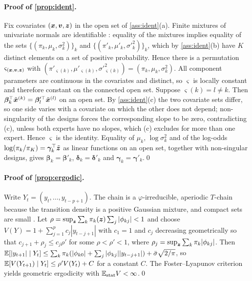 \paragraph{Proof of \cref{prop:ident}.}
Fix covariates $(\bm{x},\bm{v},\bm{z})$ in the open set of \cref{ass:ident}(a). Finite mixtures of
univariate normals are identifiable \citep{teicher1963identifiability}: equality of the mixtures
implies equality of the sets $\{(\pi_k,\mu_k,\sigma_k^2)\}_{k}$ and $\{(\pi'_k,\mu'_k,\sigma'^2_k)\}_k$,
which by \cref{ass:ident}(b) have $K$ distinct elements on a set of positive probability. Hence there
is a permutation $\varsigma_{(\bm{x},\bm{v},\bm{z})}$ with
$(\pi'_{\varsigma(k)},\mu'_{\varsigma(k)},\sigma'^2_{\varsigma(k)})=(\pi_k,\mu_k,\sigma_k^2)$. All
component parameters are continuous in the covariates and distinct, so $\varsigma$ is locally
constant and therefore constant on the connected open set. Suppose $\varsigma(k)=l\neq k$. Then
$\bm\beta_k^\top\tilde{\bm{x}}^{(k)}=\bm\beta_l'^\top\tilde{\bm{x}}^{(l)}$ on an open set. By
\cref{ass:ident}(c) the two covariate sets differ, so one side varies with a covariate on which the
other does not depend; non-singularity of the designs forces the corresponding slope to be zero,
contradicting (c), unless both experts have no slopes, which (c) excludes for more than one expert.
Hence $\varsigma$ is the identity. Equality of $\mu_k$, $\log\sigma_k^2$ and of the log-odds
$\log(\pi_k/\pi_K)=\bm\gamma_k^\top\tilde{\bm{z}}$ as linear functions on an open set, together with
non-singular designs, gives $\bm\beta_k=\bm\beta'_k$, $\bm\delta_k=\bm\delta'_k$ and
$\bm\gamma_k=\bm\gamma'_k$.\qed

\paragraph{Proof of \cref{prop:ergodic}.}
Write $Y_t=(y_t,\dots,y_{t-p+1})$. The chain is a $\varphi$-irreducible, aperiodic $T$-chain because
the transition density is a positive Gaussian mixture, and compact sets are small
\citep[Ch.~5--6]{meyn2009markov}. Let $\rho=\sup_{\bm{z}}\sum_k\pi_k(\bm{z})\sum_j|\phi_{kj}|<1$ and choose
$V(Y)=1+\sum_{j=1}^pc_j|y_{t-j+1}|$ with $c_1=1$ and $c_j$ decreasing geometrically so that
$c_{j+1}+\rho_j\le c_j\rho'$ for some $\rho<\rho'<1$, where $\rho_j=\sup_{\bm{z}}\sum_k\pi_k|\phi_{kj}|$.
Then
$\mathbb{E}[|y_{t+1}|\mid Y_t]\le\sum_k\pi_k(|\phi_{k0}|+\sum_j|\phi_{kj}||y_{t-j+1}|)+\bar\sigma\sqrt{2/\pi}$,
so $\mathbb{E}[V(Y_{t+1})\mid Y_t]\le\rho'V(Y_t)+C$ for a constant $C$. The Foster--Lyapunov criterion
\citep[Thm.~15.0.1]{meyn2009markov} yields geometric ergodicity with
$\mathbb{E}_{\text{stat}}V<\infty$.\qed

